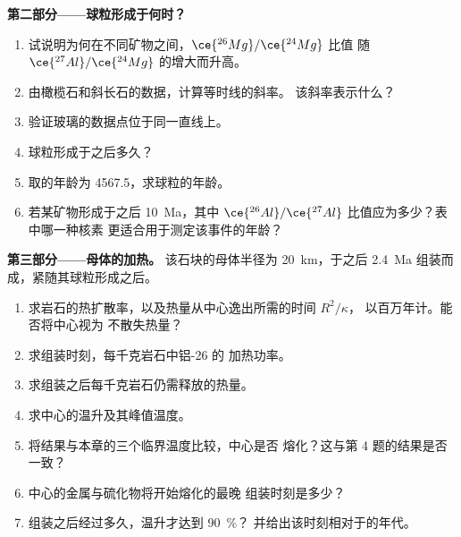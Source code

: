 \begin{problem}
\noindent\textbf{第二部分——球粒形成于何时？}
\begin{enumerate}[resume]
  \item 试说明为何在不同矿物之间，$\ce{^{26}Mg}/\ce{^{24}Mg}$ 比值
        随 $\ce{^{27}Al}/\ce{^{24}Mg}$ 的增大而升高。
  \item 由橄榄石和斜长石的数据，计算等时线的斜率。
        该斜率表示什么？
  \item 验证玻璃的数据点位于同一直线上。
  \item 球粒形成于之后多久？
  \item 取的年龄为 \qty{4567.5}{\Ma}，求球粒的年龄。
  \item 若某矿物形成于之后 
        \qty{10}{Ma}，其中 $\ce{^{26}Al}/\ce{^{27}Al}$ 比值应为多少？表中哪一种核素
        更适合用于测定该事件的年龄？
\end{enumerate}

\noindent\textbf{第三部分——母体的加热。}
该石块的母体半径为 \qty{20}{km}，于之后
\qty{2.4}{Ma} 组装而成，紧随其球粒形成之后。
\begin{enumerate}[resume]
  \item 求岩石的热扩散率，以及热量从中心逸出所需的时间 $R^2/\kappa$，
        以百万年计。能否将中心视为
        不散失热量？
  \item 求组装时刻，每千克岩石中铝-26 的
        加热功率。
  \item 求组装之后每千克岩石仍需释放的热量。
  \item 求中心的温升及其峰值温度。
  \item 将结果与本章的三个临界温度比较，中心是否
        熔化？这与第 4 题的结果是否一致？
  \item 中心的金属与硫化物将开始熔化的最晚
        组装时刻是多少？
  \item 组装之后经过多久，温升才达到 \qty{90}{\percent}？
        并给出该时刻相对于的年代。
\end{enumerate}


\end{problem}
